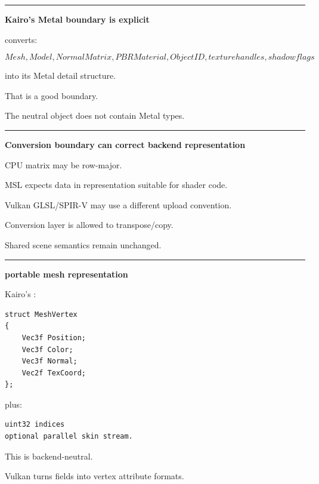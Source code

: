 \begin{center}\rule{0.5\linewidth}{0.5pt}\end{center}

\textbf{Kairo's Metal boundary is explicit}

 converts:

\[
Mesh,
Model,
NormalMatrix,
PBRMaterial,
ObjectID,
texture handles,
shadow flags
\]

into its Metal detail structure.

That is a good boundary.

The neutral object does not contain Metal types.

\begin{center}\rule{0.5\linewidth}{0.5pt}\end{center}

\textbf{Conversion boundary can correct backend representation}

CPU matrix may be row-major.

MSL expects data in representation suitable for shader code.

Vulkan GLSL/SPIR-V may use a different upload convention.

Conversion layer is allowed to transpose/copy.

Shared scene semantics remain unchanged.

\begin{center}\rule{0.5\linewidth}{0.5pt}\end{center}

\textbf{portable mesh representation}

Kairo's :

\begin{verbatim}
struct MeshVertex
{
    Vec3f Position;
    Vec3f Color;
    Vec3f Normal;
    Vec2f TexCoord;
};
\end{verbatim}

plus:

\begin{verbatim}
uint32 indices
optional parallel skin stream.
\end{verbatim}

This is backend-neutral.

Vulkan turns fields into vertex attribute formats.

